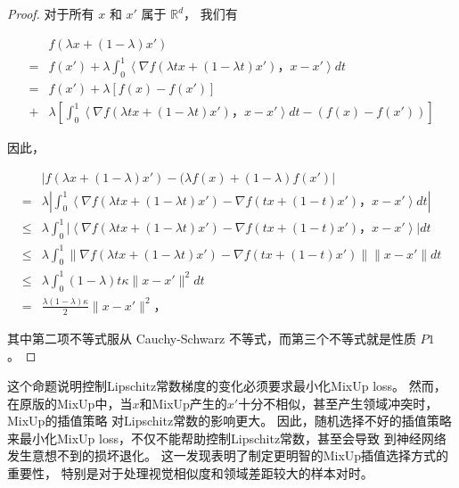 \documentclass[promaster]{thesis-uestc}
\begin{document}
\begin{proof}
    对于所有 $x$ 和 $x'$ 属于 $\mathbb R^d$， 我们有
    \begin{small}
        \begin{equation}
            \begin{split}
                & f(\lambda x + (1-\lambda )x' )\\ 
                =&f(x') + \lambda \int_0^1 \left\langle \nabla f(\lambda t x + (1-\lambda t)x')， x-x' \right\rangle dt \\
                =&f(x')+\lambda [f(x) - f(x')] \\
                +& \lambda \left[\int_0^1 \left\langle \nabla f(\lambda t x + (1-\lambda t)x')， x-x' \right\rangle dt - (f(x)-f(x'))\right] 
            \end{split}
        \end{equation}
    \end{small}
    因此，
    \begin{small}
    \begin{equation}
        \begin{split}
            & |f(\lambda x + (1-\lambda )x' ) - (\lambda f(x) + (1 - \lambda )f(x')|\\
            =& \lambda \left|\int_0^1 \left\langle \nabla f(\lambda t x + (1-\lambda t)x') - \nabla f(t x + (1 - t)x')， x-x' \right\rangle dt\right| \\
            \le & \lambda \int_0^1 \left| \left\langle \nabla f(\lambda t x + (1-\lambda t)x') - \nabla f(t x + (1 - t)x')， x-x' \right\rangle \right| dt \\
            \le & \lambda \int_0^1 \| \nabla f(\lambda t x + (1-\lambda t)x') - \nabla f(t x + (1 - t)x')\| \| x-x' \| dt  \\
            \le & \lambda \int_0^1 (1 - \lambda )t \kappa\| x - x'\|^2 dt \\
            =& \frac{\lambda(1-\lambda )\kappa}{2} \| x - x' \|^2，
        \end{split}
    \end{equation}
    \end{small}
    其中第二项不等式服从 Cauchy-Schwarz 不等式，而第三个不等式就是性质 $P1$。
\end{proof}

这个命题说明控制Lipschitz常数梯度的变化必须要求最小化MixUp loss。
然而，在原版的MixUp中，当$x$和MixUp产生的$x'$十分不相似，甚至产生领域冲突时，MixUp的插值策略
对Lipschitz常数的影响更大。
因此，随机选择不好的插值策略来最小化MixUp loss，不仅不能帮助控制Lipschitz常数，甚至会导致
到神经网络发生意想不到的损坏退化。 这一发现表明了制定更明智的MixUp插值选择方式的重要性，
特别是对于处理视觉相似度和领域差距较大的样本对时。
\end{document}
